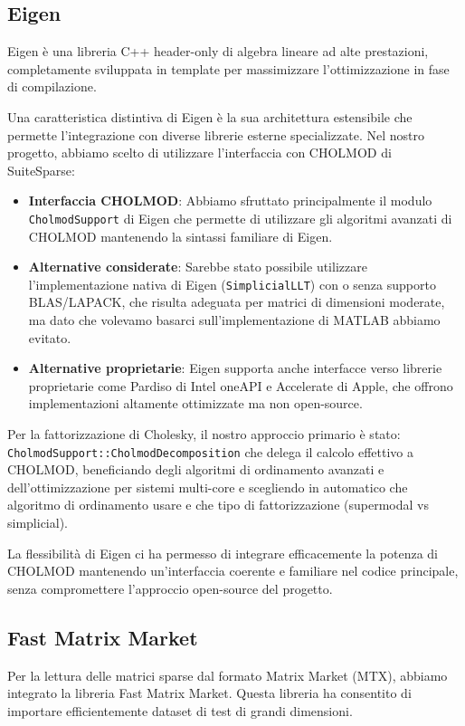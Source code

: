 \subsection{Eigen}
Eigen è una libreria C++ header-only di algebra lineare ad alte prestazioni, completamente sviluppata in template 
per massimizzare l'ottimizzazione in fase di compilazione.

Una caratteristica distintiva di Eigen è la sua architettura estensibile che permette 
l'integrazione con diverse librerie esterne specializzate. Nel nostro progetto, 
abbiamo scelto di utilizzare l'interfaccia con CHOLMOD di SuiteSparse:

\begin{itemize}
    \item \textbf{Interfaccia CHOLMOD}: Abbiamo sfruttato principalmente il modulo \texttt{CholmodSupport} di Eigen che 
    permette di utilizzare gli algoritmi avanzati di CHOLMOD mantenendo la sintassi familiare di Eigen. 
    
    \item \textbf{Alternative considerate}: Sarebbe stato possibile utilizzare l'implementazione nativa di Eigen 
    (\texttt{SimplicialLLT}) con o senza supporto BLAS/LAPACK, che risulta adeguata per matrici di dimensioni moderate, 
    ma dato che volevamo basarci sull'implementazione di MATLAB abbiamo evitato.
    
    \item \textbf{Alternative proprietarie}: Eigen supporta anche interfacce verso librerie proprietarie come Pardiso di Intel oneAPI e 
    Accelerate di Apple, che offrono implementazioni altamente ottimizzate ma non open-source.
\end{itemize}

Per la fattorizzazione di Cholesky, il nostro approccio primario è stato:
\texttt{CholmodSupport::CholmodDecomposition} che delega il calcolo effettivo a CHOLMOD, beneficiando degli algoritmi di ordinamento 
avanzati e dell'ottimizzazione per sistemi multi-core e scegliendo in automatico che algoritmo di ordinamento usare e che tipo di fattorizzazione
(supermodal vs simplicial).

La flessibilità di Eigen ci ha permesso di integrare efficacemente la potenza di CHOLMOD mantenendo un'interfaccia coerente e familiare nel codice principale, senza compromettere l'approccio open-source del progetto.

\subsection{Fast Matrix Market}
Per la lettura delle matrici sparse dal formato Matrix Market (MTX), abbiamo integrato la libreria Fast Matrix Market. 
Questa libreria ha consentito di importare efficientemente dataset di test di grandi dimensioni.

